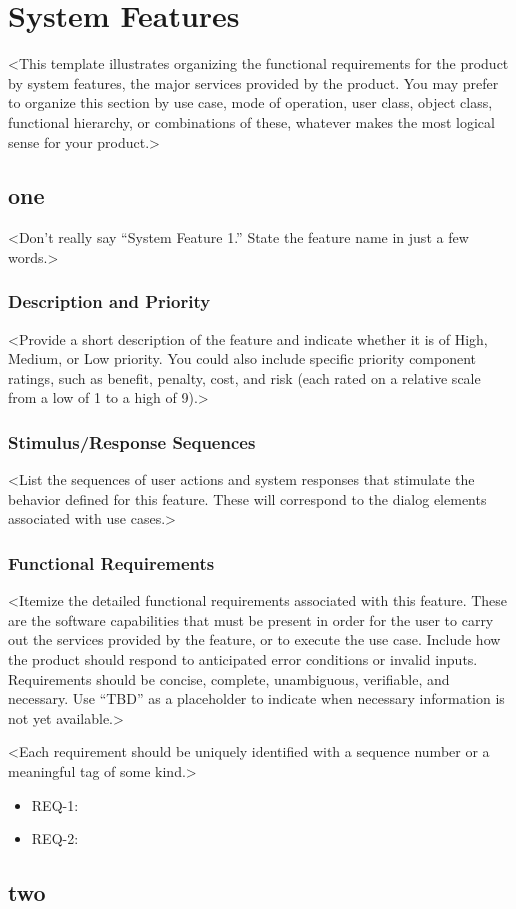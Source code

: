 \chapter{System Features} \label{cap:cap4}
<This template illustrates organizing the functional requirements for the product by system features, the major services provided by the product. You may prefer to organize this section by use case, mode of operation, user class, object class, functional hierarchy, or combinations of these, whatever makes the most logical sense for your product.>

\section{one}
<Don’t really say “System Feature 1.” State the feature name in just a few words.>
\subsection{Description and Priority}
<Provide a short description of the feature and indicate whether it is of High, Medium, or Low priority. You could also include specific priority component ratings, such as benefit, penalty, cost, and risk (each rated on a relative scale from a low of 1 to a high of 9).>
\subsection{Stimulus/Response Sequences}
<List the sequences of user actions and system responses that stimulate the behavior defined for this feature. These will correspond to the dialog elements associated with use cases.>
\subsection{Functional Requirements}
<Itemize the detailed functional requirements associated with this feature. These are the software capabilities that must be present in order for the user to carry out the services provided by the feature, or to execute the use case. Include how the product should respond to anticipated error conditions or invalid inputs. Requirements should be concise, complete, unambiguous, verifiable, and necessary. Use “TBD” as a placeholder to indicate when necessary information is not yet available.>

<Each requirement should be uniquely identified with a sequence number or a meaningful tag of some kind.>
\begin{itemize}
\item REQ-1:
\item REQ-2:
\end{itemize}
\section{two}

